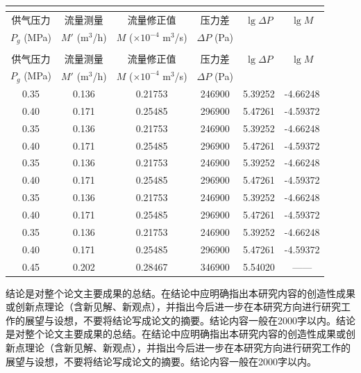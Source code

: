 \begin{longtable}{C{0.15} C{0.15} C{0.25} C{0.15} C{0.15} C{0.15}}
\label{tab:permeability} \\ %

\toprule[1.5pt]
供气压力 & 流量测量 & 流量修正值 & 压力差 & $\lg \Delta P$ & $\lg M$ \\ 
$P_g$ (MPa) & $M'$ (m$^3$/h) & $M$ ($\times10^{-4}$ m$^3$/s) & $\Delta P$ (Pa) & & \\  %
\midrule[1pt]
\endfirsthead

 \\ %
\toprule[1.5pt]
供气压力 & 流量测量 & 流量修正值 & 压力差 & $\lg \Delta P$ & $\lg M$ \\ 
$P_g$ (MPa) & $M'$ (m$^3$/h) & $M$ ($\times10^{-4}$ m$^3$/s) & $\Delta P$ (Pa) & & \\ %
\midrule[1pt]
\endhead

\bottomrule[1.5pt]
\endfoot

0.35 & 0.136 & 0.21753 & 246900 & 5.39252 & -4.66248 \\  
0.40 & 0.171 & 0.25485 & 296900 & 5.47261 & -4.59372 \\
0.35 & 0.136 & 0.21753 & 246900 & 5.39252 & -4.66248 \\
0.40 & 0.171 & 0.25485 & 296900 & 5.47261 & -4.59372 \\
0.35 & 0.136 & 0.21753 & 246900 & 5.39252 & -4.66248 \\
0.40 & 0.171 & 0.25485 & 296900 & 5.47261 & -4.59372 \\
0.35 & 0.136 & 0.21753 & 246900 & 5.39252 & -4.66248 \\
0.40 & 0.171 & 0.25485 & 296900 & 5.47261 & -4.59372 \\
0.35 & 0.136 & 0.21753 & 246900 & 5.39252 & -4.66248 \\
0.40 & 0.171 & 0.25485 & 296900 & 5.47261 & -4.59372 \\
0.45 & 0.202 & 0.28467 & 346900 & 5.54020 & —— 
\end{longtable}

结论是对整个论文主要成果的总结。在结论中应明确指出本研究内容的创造性成果或创新点理论（含新见解、新观点），并指出今后进一步在本研究方向进行研究工作的展望与设想，不要将结论写成论文的摘要。结论内容一般在2000字以内。结论是对整个论文主要成果的总结。在结论中应明确指出本研究内容的创造性成果或创新点理论（含新见解、新观点），并指出今后进一步在本研究方向进行研究工作的展望与设想，不要将结论写成论文的摘要。结论内容一般在2000字以内。